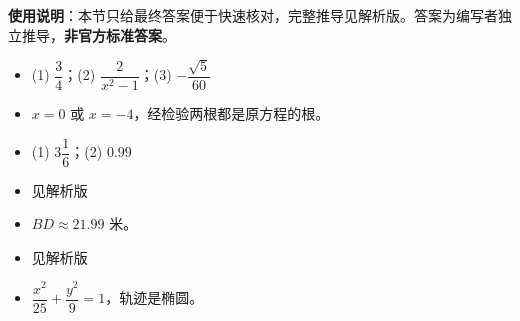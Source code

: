 
\begin{gknotice}
\textbf{使用说明}：本节只给最终答案便于快速核对，完整推导见解析版。答案为编写者独立推导，\textbf{非官方标准答案}。
\end{gknotice}

\begin{itemize}[leftmargin=2.6em]
  \item[\textbf{1.}] (1) $\dfrac{3}{4}$；(2) $\dfrac{2}{x^2-1}$；(3) $-\dfrac{\sqrt{5}}{60}$
  \item[\textbf{2.}] $x=0$ 或 $x=-4$，经检验两根都是原方程的根。
  \item[\textbf{3.}] (1) $3\dfrac{1}{6}$；(2) $0.99$
  \item[\textbf{4.}] 见解析版
  \item[\textbf{5.}] $BD\approx 21.99$ 米。
  \item[\textbf{6.}] 见解析版
  \item[\textbf{7.}] $\dfrac{x^2}{25}+\dfrac{y^2}{9}=1$，轨迹是椭圆。
\end{itemize}
